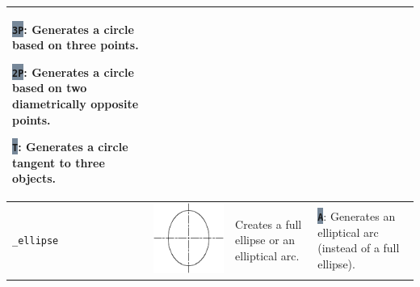 \documentclass[..]{../IEEEphot}
\newcommand{\param}[1]{\colorbox{LightSlateGray}{\color{Navy}\texttt{\textbf{#1}}}}
\begin{document}
\begin{center}
\begin{longtable}{m{.1\linewidth}m{.2\linewidth}m{.3\linewidth}m{.3\linewidth}}
\param{3P}: Generates a circle based on three points.

\param{2P}: Generates a circle based on two diametrically opposite points.

\param{T}: Generates a circle tangent to three objects.
\\	

\midrule
\texttt{\_ellipse} & \includegraphics[width = 0.8\linewidth, keepaspectratio]{../images/jpg/_ellipse.jpg}
& Creates a full ellipse or an elliptical arc. & 
\param{A}: Generates an elliptical arc (instead of a full ellipse).


\end{longtable}
\end{center}
\end{document}
